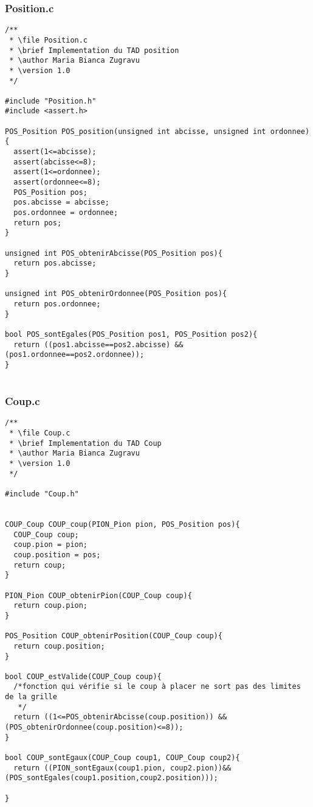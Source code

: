 \subsubsection{Position.c}
\begin{lstlisting}
/**
 * \file Position.c
 * \brief Implementation du TAD position
 * \author Maria Bianca Zugravu
 * \version 1.0
 */

#include "Position.h"
#include <assert.h>

POS_Position POS_position(unsigned int abcisse, unsigned int ordonnee){
  assert(1<=abcisse);
  assert(abcisse<=8);
  assert(1<=ordonnee);
  assert(ordonnee<=8);
  POS_Position pos;
  pos.abcisse = abcisse;
  pos.ordonnee = ordonnee;
  return pos;
}

unsigned int POS_obtenirAbcisse(POS_Position pos){
  return pos.abcisse;
}

unsigned int POS_obtenirOrdonnee(POS_Position pos){
  return pos.ordonnee;
}

bool POS_sontEgales(POS_Position pos1, POS_Position pos2){
  return ((pos1.abcisse==pos2.abcisse) && (pos1.ordonnee==pos2.ordonnee));
}
  
\end{lstlisting}

\subsubsection{Coup.c}
\begin{lstlisting}
/**
 * \file Coup.c
 * \brief Implementation du TAD Coup
 * \author Maria Bianca Zugravu
 * \version 1.0
 */

#include "Coup.h"


COUP_Coup COUP_coup(PION_Pion pion, POS_Position pos){
  COUP_Coup coup;
  coup.pion = pion;
  coup.position = pos;
  return coup;
}

PION_Pion COUP_obtenirPion(COUP_Coup coup){
  return coup.pion;
}

POS_Position COUP_obtenirPosition(COUP_Coup coup){
  return coup.position;
}

bool COUP_estValide(COUP_Coup coup){
  /*fonction qui vérifie si le coup à placer ne sort pas des limites de la grille
   */
  return ((1<=POS_obtenirAbcisse(coup.position)) && (POS_obtenirOrdonnee(coup.position)<=8));
}

bool COUP_sontEgaux(COUP_Coup coup1, COUP_Coup coup2){
  return ((PION_sontEgaux(coup1.pion, coup2.pion))&&(POS_sontEgales(coup1.position,coup2.position)));

}
  
\end{lstlisting}

